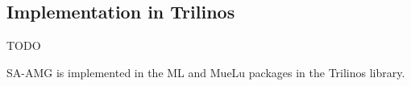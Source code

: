\subsection{Implementation in Trilinos}
TODO

SA-AMG is implemented in the ML and MueLu packages in the Trilinos library.

